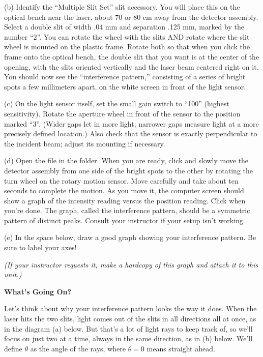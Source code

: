 
(b) Identify the ``Multiple Slit Set'' slit accessory.  You will place this on the optical bench near the laser, about 70 or 80 cm away from the detector assembly.  Select a double slit of width .04 mm and separation .125 mm, marked by the number ``2''. You can rotate the wheel with the slits AND rotate where the slit wheel is mounted on the plastic frame.  
Rotate both so that when you click the frame onto the optical bench, the double slit that you want is at the center of the opening, with the slits oriented vertically and the laser beam centered right on it.  You should now see the ``interference pattern,'' consisting of a series of bright spots a few millimeters apart, on the white screen in front of the light sensor.


(c) On the light sensor itself, set the small gain switch to ``100'' (highest sensitivity).  Rotate the aperture wheel in front of the sensor to the position marked ``3''.  (Wider gaps let in more light; narrower gaps measure light at a more precisely defined location.)  Also check that the sensor is exactly perpendicular to the incident beam; adjust its mounting if necessary.


(d) Open the file  in the \filename{\coursefolder} folder. 
When you are ready, click  and slowly move the detector assembly 
from one side of the bright spots to the other by rotating the turn wheel on the rotary 
motion sensor. Move carefully and take about ten seconds to complete the 
motion. 
As you move it, the computer screen should show a graph of the intensity reading versus the position reading. 
Click  when you're done. 
The graph, called the interference pattern, should be a symmetric pattern of distinct peaks. Consult your instructor if your setup isn't working.

\pagebreak[2]
(e) In the space below, draw a good graph showing your interference pattern.  
Be sure to label your axes!
\answerspace{1.5in}

\textit{(If your instructor requests it, make a hardcopy of this graph and attach it to this unit.)}

\textbf{What's Going On?}

Let's think about why your interference pattern looks the way it does.  When the laser hits the two slits, 
light comes out of the slits in all directions all at once, as in the diagram (a) below.  
But that's a lot of light rays to keep track of, so we'll focus on just two at a time, always in the same direction, as in (b) below.
We'll define $\theta$ as the angle of the rays, where $\theta=0$ means straight ahead.  

